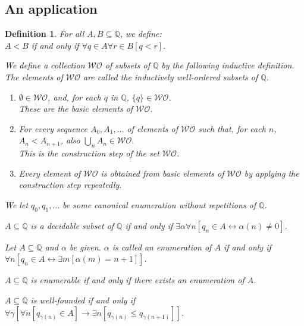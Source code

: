 \documentclass[a4paper]{amsart}
\theoremstyle{plain}
\newtheorem{definition}{Definition}
\begin{document}
 \subsection{An application} \begin{definition}\label{D:inductivewell-orderings} For all $A,B\subseteq \mathbb{Q}$, we define: \\$A<B$ if and only if $\forall q \in A\forall r \in B[q<r]$.
 
 \smallskip We define a collection $\mathcal{WO}$ of subsets of $\mathbb{Q}$ by the following inductive definition. The elements of $\mathcal{WO}$ are called the \emph{inductively  well-ordered} subsets of $\mathbb{Q}$.
 
 \begin{enumerate}[\upshape(i)]\item $\emptyset \in \mathcal{WO}$, and, for each $q$ in $\mathbb{Q}$, $\{q\}\in \mathcal{WO}$. 
 \\These are the \emph{basic elements} of $\mathcal{WO}$. 
 \item For every sequence $A_0, A_1, \ldots$ of elements of $\mathcal{WO}$ such that, for each $n$, \\$A_n<A_{n+1}$, also $\bigcup_n A_n \in \mathcal{WO}$. \\This is the \emph{construction step} of the set $\mathcal{WO}$.
 
 \item Every element of $\mathcal{WO}$ is obtained from basic elements of $\mathcal{WO}$ by applying the construction step repeatedly. \end{enumerate}
 
 \smallskip
We let $q_0, q_1, \ldots$ be some canonical  enumeration without repetitions of $\mathbb{Q}$.

$A\subseteq \mathbb{Q}$ is a \emph{decidable} subset of $\mathbb{Q}$ if and only if $\exists \alpha\forall n[q_n \in A \leftrightarrow \alpha(n)\neq 0]$.


\smallskip Let $A\subseteq \mathbb{Q}$ and $\alpha$ be given. $\alpha$ is called an \emph{enumeration of} $A$ if and only if \\$\forall n [q_n\in A \leftrightarrow  \exists m[ \alpha(m)=n+1]]$.  

$A\subseteq \mathbb{Q}$ is \emph{ enumerable} if and only if there exists an enumeration of $A$. 

\medskip $A\subseteq \mathbb{Q}$ is \emph{well-founded} if and only if $\forall \gamma[\forall n[q_{\gamma(n)} \in A]\rightarrow \exists n[q_{\gamma(n)}\le q_{\gamma(n+1)}]]$. 
 \end{definition}
\end{document}
